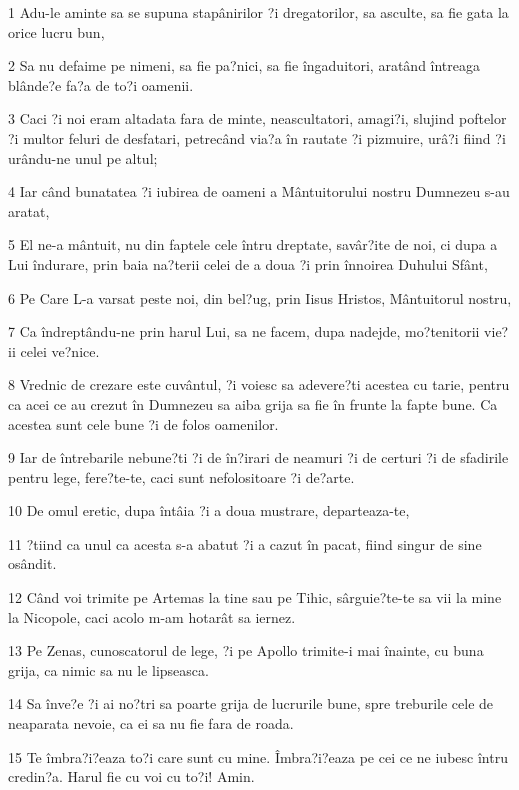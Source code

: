 \par 1 Adu-le aminte sa se supuna stapânirilor ?i dregatorilor, sa asculte, sa fie gata la orice lucru bun,
\par 2 Sa nu defaime pe nimeni, sa fie pa?nici, sa fie îngaduitori, aratând întreaga blânde?e fa?a de to?i oamenii.
\par 3 Caci ?i noi eram altadata fara de minte, neascultatori, amagi?i, slujind poftelor ?i multor feluri de desfatari, petrecând via?a în rautate ?i pizmuire, urâ?i fiind ?i urându-ne unul pe altul;
\par 4 Iar când bunatatea ?i iubirea de oameni a Mântuitorului nostru Dumnezeu s-au aratat,
\par 5 El ne-a mântuit, nu din faptele cele întru dreptate, savâr?ite de noi, ci dupa a Lui îndurare, prin baia na?terii celei de a doua ?i prin înnoirea Duhului Sfânt,
\par 6 Pe Care L-a varsat peste noi, din bel?ug, prin Iisus Hristos, Mântuitorul nostru,
\par 7 Ca îndreptându-ne prin harul Lui, sa ne facem, dupa nadejde, mo?tenitorii vie?ii celei ve?nice.
\par 8 Vrednic de crezare este cuvântul, ?i voiesc sa adevere?ti acestea cu tarie, pentru ca acei ce au crezut în Dumnezeu sa aiba grija sa fie în frunte la fapte bune. Ca acestea sunt cele bune ?i de folos oamenilor.
\par 9 Iar de întrebarile nebune?ti ?i de în?irari de neamuri ?i de certuri ?i de sfadirile pentru lege, fere?te-te, caci sunt nefolositoare ?i de?arte.
\par 10 De omul eretic, dupa întâia ?i a doua mustrare, departeaza-te,
\par 11 ?tiind ca unul ca acesta s-a abatut ?i a cazut în pacat, fiind singur de sine osândit.
\par 12 Când voi trimite pe Artemas la tine sau pe Tihic, sârguie?te-te sa vii la mine la Nicopole, caci acolo m-am hotarât sa iernez.
\par 13 Pe Zenas, cunoscatorul de lege, ?i pe Apollo trimite-i mai înainte, cu buna grija, ca nimic sa nu le lipseasca.
\par 14 Sa înve?e ?i ai no?tri sa poarte grija de lucrurile bune, spre treburile cele de neaparata nevoie, ca ei sa nu fie fara de roada.
\par 15 Te îmbra?i?eaza to?i care sunt cu mine. Îmbra?i?eaza pe cei ce ne iubesc întru credin?a. Harul fie cu voi cu to?i! Amin.


